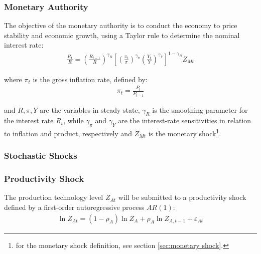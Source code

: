 \documentclass[
thesis.tex
]{subfiles}
\begin{document}
	
	\subsubsection{Monetary Authority}
	
	The objective of the monetary authority is to conduct the economy to price stability and economic growth, using a Taylor rule \cite{taylor_discretion_1993} to determine the nominal interest rate:
	\begin{align}
		\label{eq:monetary-policy}
		\frac{R_t}{R} =
		\left( \frac{R_{t-1}}{R} \right)^{\gamma_R}  \left[
		\left( \frac{\pi_t}{\pi} \right)^{\gamma_\pi}
		\left( \frac{Y_t}{Y} \right)^{\gamma_Y} \right]^{1-\gamma_R} Z_{Mt}
	\end{align}
	
	where $\pi_t$ is the gross inflation rate, defined by:
	\begin{align}
		\pi_t = \frac{P_t}{P_{t-1}}
		\label{eq:gross-inflation-rate}
	\end{align}
	
	and $R, \pi, Y$ are the variables in steady state, $\gamma_R$ is the smoothing parameter for the interest rate $R_t$, while $\gamma_\pi$ and $\gamma_Y$ are the interest-rate sensitivities in relation to inflation and product, respectively and $Z_{Mt}$ is the monetary shock\footnote{for the monetary shock definition, see section \ref{sec:monetary shock}.}.
	
	
	\subsubsection{Stochastic Shocks}\label{sec:stochastic-shocks}
	
	\subsubsection*{Productivity Shock} \label{sec:productivity shock}
	
	The production technology level $Z_{At}$ will be submitted to a productivity shock defined by a first-order autoregressive process $AR(1)$:
	\begin{align}
		\ln{Z_{At}} = (1-\rho_A)\ln{Z_A} + \rho_A\ln{Z_{A,t-1}} + \varepsilon_{At} \label{eq:productivity-shock}
	\end{align}
	
\end{document}
